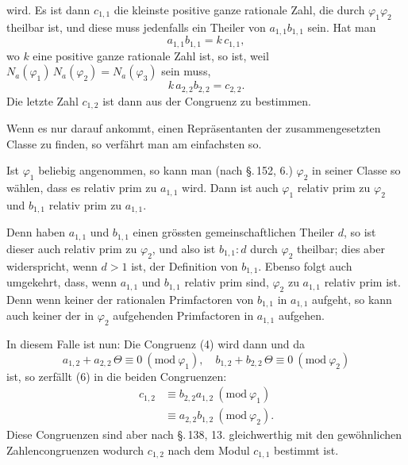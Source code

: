 
wird. Es ist dann $c_{1,1}$ die kleinste positive ganze rationale Zahl, die durch $\varphi_1 \varphi_2$ theilbar ist, und diese muss jedenfalls ein Theiler von $a_{1,1} b_{1,1}$ sein. Hat man
\[
a_{1,1} b_{1,1} = k\, c_{1,1},
\]
wo $k$ eine positive ganze rationale Zahl ist, so ist, weil $N_a(\varphi_1)\, N_a(\varphi_2) = N_a(\varphi_3)$ sein muss,
\[
k\, a_{2,2} b_{2,2} = c_{2,2}.
\]
Die letzte Zahl $c_{1,2}$ ist dann aus der Congruenz
zu bestimmen.

Wenn es nur darauf ankommt, einen Repr\"asentanten der zusammengesetzten Classe zu finden, so verf\"ahrt man am einfachsten so.

Ist $\varphi_1$ beliebig angenommen, so kann man (nach \S.\,152, 6.) $\varphi_2$ in seiner Classe so w\"ahlen, dass es relativ prim zu $a_{1,1}$ wird. Dann ist auch $\varphi_1$ relativ prim zu $\varphi_2$ und $b_{1,1}$ relativ prim zu $a_{1,1}$.

Denn haben $a_{1,1}$ und $b_{1,1}$ einen gr\"ossten gemeinschaftlichen Theiler $d$, so ist dieser auch relativ prim zu $\varphi_2$, und also ist $b_{1,1} : d$ durch $\varphi_2$ theilbar; dies aber widerspricht, wenn $d > 1$ ist, der Definition von $b_{1,1}$. Ebenso folgt auch umgekehrt, dass, wenn $a_{1,1}$ und $b_{1,1}$ relativ prim sind, $\varphi_2$ zu $a_{1,1}$ relativ prim ist. Denn wenn keiner der rationalen Primfactoren von $b_{1,1}$ in $a_{1,1}$ aufgeht, so kann auch keiner der in $\varphi_2$ aufgehenden Primfactoren in $a_{1,1}$ aufgehen.

In diesem Falle ist nun:
Die Congruenz (4) wird dann
und da
\[
a_{1,2} + a_{2,2}\,\Theta \equiv 0 \ (\mathrm{mod}\ \varphi_1), \quad b_{1,2} + b_{2,2}\,\Theta \equiv 0 \ (\mathrm{mod}\ \varphi_2)
\]
ist, so zerf\"allt (6) in die beiden Congruenzen:
\[
\begin{aligned}
c_{1,2} &\equiv b_{2,2} a_{1,2} \ (\mathrm{mod}\ \varphi_1) \\
&\equiv a_{2,2} b_{1,2} \ (\mathrm{mod}\ \varphi_2).
\end{aligned}
\]
Diese Congruenzen sind aber nach \S.\,138, 13. gleichwerthig mit den gew\"ohnlichen Zahlencongruenzen
wodurch $c_{1,2}$ nach dem Modul $c_{1,1}$ bestimmt ist.
